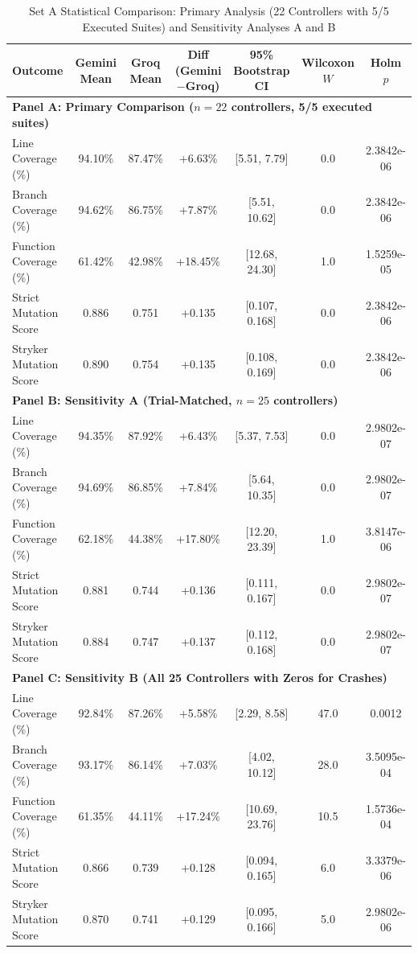 \begin{table}[htbp]
\centering
\caption{Set A Statistical Comparison: Primary Analysis (22 Controllers with 5/5 Executed Suites) and Sensitivity Analyses A and B}
\label{tab:seta_comparison}
\begin{tabular}{lcccccc}
\toprule
\textbf{Outcome} & \textbf{Gemini Mean} & \textbf{Groq Mean} & \textbf{Diff (Gemini$-$Groq)} & \textbf{95\% Bootstrap CI} & \textbf{Wilcoxon $W$} & \textbf{Holm $p$} \\
\midrule
\multicolumn{7}{l}{\textbf{Panel A: Primary Comparison ($n=22$ controllers, 5/5 executed suites)}} \\
\midrule
Line Coverage (\%) & 94.10\% & 87.47\% & +6.63\% & [5.51, 7.79] & 0.0 & 2.3842e-06 \\
Branch Coverage (\%) & 94.62\% & 86.75\% & +7.87\% & [5.51, 10.62] & 0.0 & 2.3842e-06 \\
Function Coverage (\%) & 61.42\% & 42.98\% & +18.45\% & [12.68, 24.30] & 1.0 & 1.5259e-05 \\
Strict Mutation Score & 0.886 & 0.751 & +0.135 & [0.107, 0.168] & 0.0 & 2.3842e-06 \\
Stryker Mutation Score & 0.890 & 0.754 & +0.135 & [0.108, 0.169] & 0.0 & 2.3842e-06 \\
\midrule
\multicolumn{7}{l}{\textbf{Panel B: Sensitivity A (Trial-Matched, $n=25$ controllers)}} \\
\midrule
Line Coverage (\%) & 94.35\% & 87.92\% & +6.43\% & [5.37, 7.53] & 0.0 & 2.9802e-07 \\
Branch Coverage (\%) & 94.69\% & 86.85\% & +7.84\% & [5.64, 10.35] & 0.0 & 2.9802e-07 \\
Function Coverage (\%) & 62.18\% & 44.38\% & +17.80\% & [12.20, 23.39] & 1.0 & 3.8147e-06 \\
Strict Mutation Score & 0.881 & 0.744 & +0.136 & [0.111, 0.167] & 0.0 & 2.9802e-07 \\
Stryker Mutation Score & 0.884 & 0.747 & +0.137 & [0.112, 0.168] & 0.0 & 2.9802e-07 \\
\midrule
\multicolumn{7}{l}{\textbf{Panel C: Sensitivity B (All 25 Controllers with Zeros for Crashes)}} \\
\midrule
Line Coverage (\%) & 92.84\% & 87.26\% & +5.58\% & [2.29, 8.58] & 47.0 & 0.0012 \\
Branch Coverage (\%) & 93.17\% & 86.14\% & +7.03\% & [4.02, 10.12] & 28.0 & 3.5095e-04 \\
Function Coverage (\%) & 61.35\% & 44.11\% & +17.24\% & [10.69, 23.76] & 10.5 & 1.5736e-04 \\
Strict Mutation Score & 0.866 & 0.739 & +0.128 & [0.094, 0.165] & 6.0 & 3.3379e-06 \\
Stryker Mutation Score & 0.870 & 0.741 & +0.129 & [0.095, 0.166] & 5.0 & 2.9802e-06 \\
\bottomrule
\end{tabular}
\end{table}

